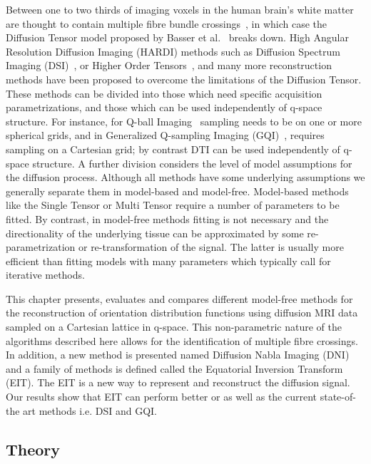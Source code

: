 \documentclass{bioinfo}
\begin{document}
Between one to two thirds of imaging voxels in the human brain's white
matter are thought to contain multiple fibre bundle crossings~\cite{Behrens2007NeuroImage},
in which case the Diffusion Tensor model proposed by Basser et al.~\cite{Basser1994}
breaks down. High Angular Resolution Diffusion Imaging (HARDI) methods
\cite{Tuch2002} such as Diffusion Spectrum Imaging (DSI)~\cite{callaghan1988nmr},
\cite{wedeen2005mapping} or Higher Order Tensors~\cite{ozarslan2003generalized},
\cite{barmpoutis2009regularized} and many more reconstruction methods
have been proposed to overcome the limitations of the Diffusion Tensor.
These methods can be divided into those which need specific acquisition
parametrizations, and those which can be used independently of q-space
structure. For instance, for Q-ball Imaging~\cite{Tuch2004} sampling
needs to be on one or more spherical grids, and in Generalized Q-sampling
Imaging (GQI)~\cite{Yeh2010}, requires sampling on a Cartesian grid;
by contrast DTI can be used independently of q-space structure. A
further division considers the level of model assumptions for the
diffusion process. Although all methods have some underlying assumptions
we generally separate them in model-based and model-free. Model-based
methods like the Single Tensor or Multi Tensor require a number of
parameters to be fitted. By contrast, in model-free methods fitting
is not necessary and the directionality of the underlying tissue can
be approximated by some re-parametrization or re-transformation of
the signal. The latter is usually more efficient than fitting models
with many parameters which typically call for iterative methods.

This chapter presents, evaluates and compares different model-free
methods for the reconstruction of orientation distribution functions
using diffusion MRI data sampled on a Cartesian lattice in q-space.
This non-parametric nature of the algorithms described here allows
for the identification of multiple fibre crossings. In addition, a
new method is presented named Diffusion Nabla Imaging (DNI) and a
family of methods is defined called the Equatorial Inversion Transform
(EIT). The EIT is a new way to represent and reconstruct the diffusion
signal. Our results show that EIT can perform better or as well as
the current state-of-the art methods i.e. DSI and GQI.


\subsection{Theory}
\end{document}
